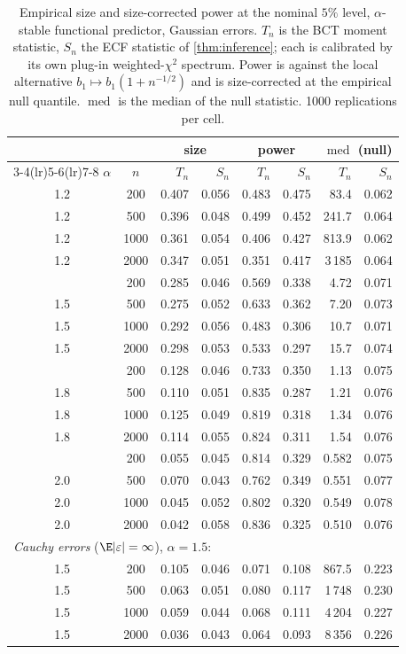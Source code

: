 \begin{table}[t]
\centering
\caption{Empirical size and size-corrected power at the nominal $5\%$ level, $\alpha$-stable functional predictor, Gaussian errors. $T_n$ is the BCT moment statistic, $S_n$ the ECF statistic of \cref{thm:inference}; each is calibrated by its own plug-in weighted-$\chi^2$ spectrum. Power is against the local alternative $b_1\mapsto b_1(1+n^{-1/2})$ and is size-corrected at the empirical null quantile. $\operatorname{med}$ is the median of the null statistic. 1000 replications per cell.}
\label{tab:sim}
\begin{tabular}{cc rr rr rr}
\toprule
& & \multicolumn{2}{c}{size} & \multicolumn{2}{c}{power} & \multicolumn{2}{c}{$\operatorname{med}$ (null)} \\
\cmidrule(lr){3-4}\cmidrule(lr){5-6}\cmidrule(lr){7-8}
$\alpha$ & $n$ & $T_n$ & $S_n$ & $T_n$ & $S_n$ & $T_n$ & $S_n$ \\
\midrule
1.2 & 200 & 0.407 & 0.056 & 0.483 & 0.475 & 83.4 & 0.062 \\
1.2 & 500 & 0.396 & 0.048 & 0.499 & 0.452 & 241.7 & 0.064 \\
1.2 & 1000 & 0.361 & 0.054 & 0.406 & 0.427 & 813.9 & 0.062 \\
1.2 & 2000 & 0.347 & 0.051 & 0.351 & 0.417 & 3\,185 & 0.064 \\
\addlinespace
1.5 & 200 & 0.285 & 0.046 & 0.569 & 0.338 & 4.72 & 0.071 \\
1.5 & 500 & 0.275 & 0.052 & 0.633 & 0.362 & 7.20 & 0.073 \\
1.5 & 1000 & 0.292 & 0.056 & 0.483 & 0.306 & 10.7 & 0.071 \\
1.5 & 2000 & 0.298 & 0.053 & 0.533 & 0.297 & 15.7 & 0.074 \\
\addlinespace
1.8 & 200 & 0.128 & 0.046 & 0.733 & 0.350 & 1.13 & 0.075 \\
1.8 & 500 & 0.110 & 0.051 & 0.835 & 0.287 & 1.21 & 0.076 \\
1.8 & 1000 & 0.125 & 0.049 & 0.819 & 0.318 & 1.34 & 0.076 \\
1.8 & 2000 & 0.114 & 0.055 & 0.824 & 0.311 & 1.54 & 0.076 \\
\addlinespace
2.0 & 200 & 0.055 & 0.045 & 0.814 & 0.329 & 0.582 & 0.075 \\
2.0 & 500 & 0.070 & 0.043 & 0.762 & 0.349 & 0.551 & 0.077 \\
2.0 & 1000 & 0.045 & 0.052 & 0.802 & 0.320 & 0.549 & 0.078 \\
2.0 & 2000 & 0.042 & 0.058 & 0.836 & 0.325 & 0.510 & 0.076 \\
\midrule
\multicolumn{8}{l}{\emph{Cauchy errors} ($\E|\varepsilon|=\infty$), $\alpha=1.5$:}\\
1.5 & 200 & 0.105 & 0.046 & 0.071 & 0.108 & 867.5 & 0.223 \\
1.5 & 500 & 0.063 & 0.051 & 0.080 & 0.117 & 1\,748 & 0.230 \\
1.5 & 1000 & 0.059 & 0.044 & 0.068 & 0.111 & 4\,204 & 0.227 \\
1.5 & 2000 & 0.036 & 0.043 & 0.064 & 0.093 & 8\,356 & 0.226 \\
\bottomrule
\end{tabular}
\end{table}
